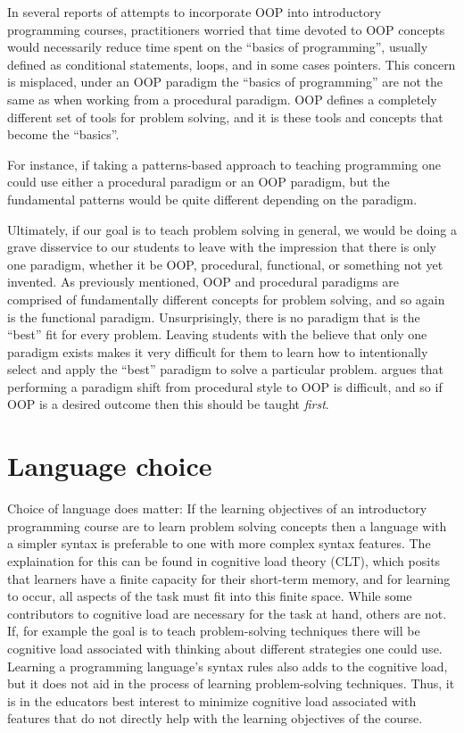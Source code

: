 \documentclass[12pt]{article}
\begin{document}
In several reports of attempts to incorporate OOP into introductory
programming courses, practitioners worried that time devoted to OOP
concepts would necessarily reduce time spent on the ``basics of
programming'', usually defined as conditional statements, loops, and
in some cases pointers. This concern is misplaced, under an OOP
paradigm the ``basics of programming'' are not the same as when
working from a procedural paradigm. OOP defines a completely different
set of tools for problem solving, and it is these tools and concepts
that become the
``basics''\autocite{kolling_problem_1999,kay_history_1996}.

For instance, if taking a patterns-based approach to teaching
programming one could use either a procedural paradigm or an OOP
paradigm, but the fundamental patterns would be quite different
depending on the paradigm\autocite{wallingford_first_1996}.

Ultimately, if our goal is to teach problem solving in general, we
would be doing a grave disservice to our students to leave with the
impression that there is only one paradigm, whether it be OOP,
procedural, functional, or something not yet invented. As previously
mentioned, OOP and procedural paradigms are comprised of fundamentally
different concepts for problem solving, and so again is the functional
paradigm. Unsurprisingly, there is no paradigm that is the ``best''
fit for every problem. Leaving students with the believe that only one
paradigm exists makes it very difficult for them to learn how to
intentionally select and apply the ``best'' paradigm to solve a
particular problem. \citeauthor{kolling_problem_1999} argues that
performing a paradigm shift from procedural style to OOP is difficult,
and so if OOP is a desired outcome then this should be taught
\emph{first}.

\section{Language choice}
Choice of language does matter: If the learning objectives of an
introductory programming course are to learn problem solving concepts
then a language with a simpler syntax is preferable to one with more
complex syntax features\autocite{koulouri_teaching_2014}. The
explaination for this can be found in cognitive load theory (CLT),
which posits that learners have a finite capacity for their short-term
memory, and for learning to occur, all aspects of the task must fit
into this finite space. While some contributors to cognitive load are
necessary for the task at hand, others are
not\autocite{paas_cognitive_2003}. If, for example the goal is to
teach problem-solving techniques there will be cognitive load
associated with thinking about different strategies one could
use. Learning a programming language's syntax rules also adds to the
cognitive load, but it does not aid in the process of learning
problem-solving techniques. Thus, it is in the educators best interest
to minimize cognitive load associated with features that do not
directly help with the learning objectives of the course. 
\end{document}
